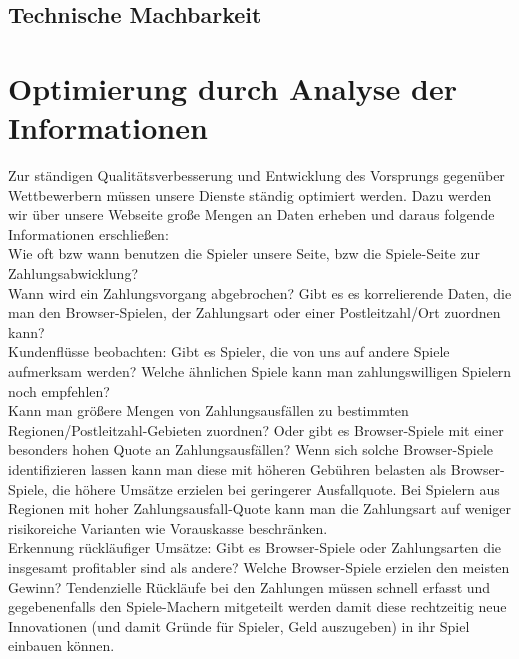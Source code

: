 \documentclass[a4paper,10pt]{article}
\begin{document}
\subsection{Technische Machbarkeit}\label{labelTechMach}



\section{Optimierung durch Analyse der Informationen}\label{labelRelDaten}
Zur ständigen Qualitätsverbesserung und Entwicklung des Vorsprungs gegenüber Wettbewerbern müssen unsere Dienste ständig optimiert werden.
Dazu werden wir über unsere Webseite große Mengen an Daten erheben und daraus folgende Informationen erschließen:\\
Wie oft bzw wann benutzen die Spieler unsere Seite, bzw die Spiele-Seite zur Zahlungsabwicklung?\\
Wann wird ein Zahlungsvorgang abgebrochen? Gibt es es korrelierende Daten, die man den Browser-Spielen, der Zahlungsart oder einer Postleitzahl/Ort zuordnen kann?\\
Kundenflüsse beobachten: Gibt es Spieler, die von uns auf andere Spiele aufmerksam werden? Welche ähnlichen Spiele kann man zahlungswilligen Spielern noch empfehlen?\\
Kann man größere Mengen von Zahlungsausfällen zu bestimmten Regionen/Postleitzahl-Gebieten zuordnen? Oder gibt es Browser-Spiele mit einer besonders hohen Quote an Zahlungsausfällen?
Wenn sich solche Browser-Spiele identifizieren lassen kann man diese mit höheren Gebühren belasten als Browser-Spiele, die höhere Umsätze erzielen bei geringerer Ausfallquote.
Bei Spielern aus Regionen mit hoher Zahlungsausfall-Quote kann man die Zahlungsart auf weniger risikoreiche Varianten wie Vorauskasse beschränken.\\
Erkennung rückläufiger Umsätze: Gibt es Browser-Spiele oder Zahlungsarten die insgesamt profitabler sind als andere? Welche Browser-Spiele erzielen den meisten Gewinn?
Tendenzielle Rückläufe bei den Zahlungen müssen schnell erfasst und gegebenenfalls den Spiele-Machern mitgeteilt werden damit diese rechtzeitig neue Innovationen (und damit Gründe für Spieler,
Geld auszugeben) in ihr Spiel einbauen können.
\end{document}
